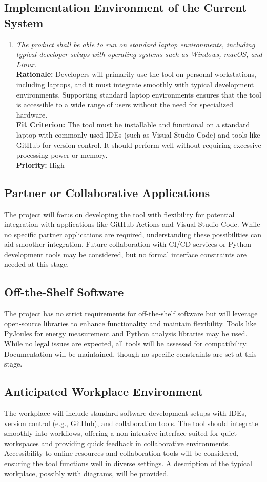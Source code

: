\documentclass[12pt]{article}
\begin{document}
\subsection{Implementation Environment of the Current System}
\begin{enumerate}[label=EC \arabic*., wide=0pt, leftmargin=*]
    \item \emph{The product shall be able to run on standard laptop environments, including typical developer setups with operating systems such as Windows, macOS, and Linux.}\\
    {\bf Rationale:} Developers will primarily use the tool on personal workstations, including laptops, and it must integrate smoothly with typical development environments. Supporting standard laptop environments ensures that the tool is accessible to a wide range of users without the need for specialized hardware.\\
    {\bf Fit Criterion:} The tool must be installable and functional on a standard laptop with commonly used IDEs (such as Visual Studio Code) and tools like GitHub for version control. It should perform well without requiring excessive processing power or memory.\\
    {\bf Priority:} High
\end{enumerate}
\subsection{Partner or Collaborative Applications}
The project will focus on developing the tool with flexibility for potential integration with applications like GitHub Actions and Visual Studio Code. While no specific partner applications are required, understanding these possibilities can aid smoother integration. Future collaboration with CI/CD services or Python development tools may be considered, but no formal interface constraints are needed at this stage.
\subsection{Off-the-Shelf Software}
The project has no strict requirements for off-the-shelf software but will leverage open-source libraries to enhance functionality and maintain flexibility. Tools like PyJoules for energy measurement and Python analysis libraries may be used. While no legal issues are expected, all tools will be assessed for compatibility. Documentation will be maintained, though no specific constraints are set at this stage.
\subsection{Anticipated Workplace Environment}
The workplace will include standard software development setups with IDEs, version control (e.g., GitHub), and collaboration tools. The tool should integrate smoothly into workflows, offering a non-intrusive interface suited for quiet workspaces and providing quick feedback in collaborative environments. Accessibility to online resources and collaboration tools will be considered, ensuring the tool functions well in diverse settings. A description of the typical workplace, possibly with diagrams, will be provided.
\end{document}
